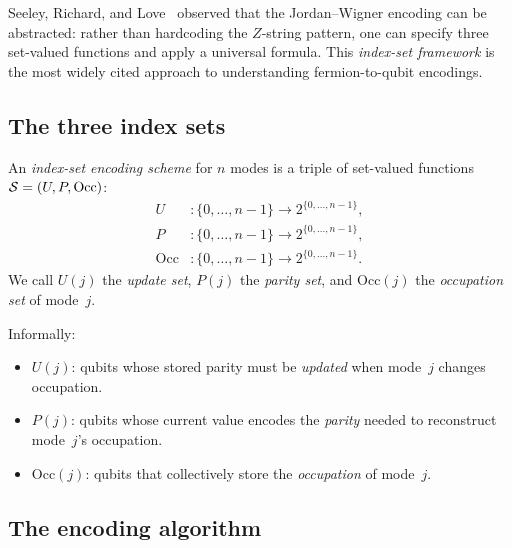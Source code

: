 %

Seeley, Richard, and Love~\cite{seeley2012} observed that the
Jordan--Wigner encoding can be abstracted: rather than hardcoding the
$Z$-string pattern, one can specify three set-valued functions and
apply a universal formula.  This \emph{index-set framework} is the
most widely cited approach to understanding fermion-to-qubit encodings.

\subsection{The three index sets}
\label{sec:three-sets}

\begin{definition}
\label{def:index-set-scheme}
An \emph{index-set encoding scheme} for $n$ modes is a triple of
set-valued functions $\mathcal{S} = (U, P, \mathrm{Occ})$:
\begin{align}
  U &: \{0, \ldots, n{-}1\} \to 2^{\{0,\ldots,n{-}1\}},
    \label{eq:update-fn} \\
  P &: \{0, \ldots, n{-}1\} \to 2^{\{0,\ldots,n{-}1\}},
    \label{eq:parity-fn} \\
  \mathrm{Occ} &: \{0, \ldots, n{-}1\} \to 2^{\{0,\ldots,n{-}1\}}.
    \label{eq:occ-fn}
\end{align}
We call $U(j)$ the \emph{update set}, $P(j)$ the \emph{parity set},
and $\mathrm{Occ}(j)$ the \emph{occupation set} of mode~$j$.
\end{definition}

Informally:
\begin{itemize}
  \item $U(j)$: qubits whose stored parity must be \emph{updated}
    when mode~$j$ changes occupation.
  \item $P(j)$: qubits whose current value encodes the \emph{parity}
    needed to reconstruct mode~$j$'s occupation.
  \item $\mathrm{Occ}(j)$: qubits that collectively store the
    \emph{occupation} of mode~$j$.
\end{itemize}

\subsection{The encoding algorithm}
\label{sec:encoding-algorithm}

